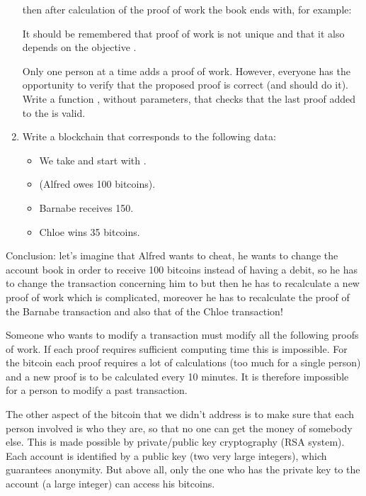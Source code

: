 \documentclass[11pt,class=report,crop=false]{standalone}
\begin{document}
\begin{activite}
\begin{enumerate}
  then after calculation of the proof of work the book ends with, for example:  
  
     It should be remembered that proof of work is not unique and that it also depends on the objective .
   
   Only one person at a time adds a proof of work. However, everyone has the opportunity to verify that the proposed proof is correct (and should do it). 
	Write a function , without parameters, that checks that the last proof added to the  is valid.
	
	\item Write a blockchain that corresponds to the following data:
	\begin{itemize}
	  \item We take  and start with .
	  \item {} (Alfred owes 100 bitcoins).
	  \item Barnabe receives 150.
	  \item Chloe wins 35 bitcoins.
	\end{itemize}

\end{enumerate} 


Conclusion: let's imagine that Alfred wants to cheat, he wants to change the account book in order to receive 100 bitcoins instead of having a debit, so he has to change the transaction concerning him to  but then he has to recalculate a new proof of work which is complicated, moreover he has to recalculate the proof of the Barnabe transaction and also that of the Chloe transaction! 

Someone who wants to modify a transaction must modify all the following proofs of work. If each proof requires sufficient computing time this is impossible. For the bitcoin each proof requires a lot of calculations (too much for a single person) and a new proof is to be calculated every 10 minutes. It is therefore impossible for a person to modify a past transaction.

\end{activite}


The other aspect of the bitcoin that we didn't address is to make sure that each person involved is who they are, so that no one can get the money of somebody else. This is made possible by private/public key cryptography (RSA system). Each account is identified by a public key (two very large integers), which guarantees anonymity. But above all, only the one who has the private key to the account (a large integer) can access his bitcoins.
\end{document}
